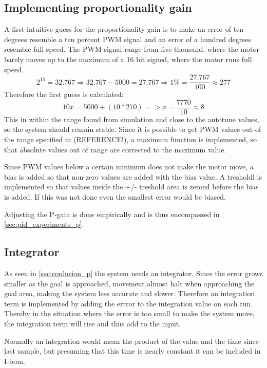 \subsection{Implementing proportionality gain}
A first intuitive guess for the proportionality gain is to make an error of ten degrees resemble a ten percent PWM signal and an error of a hundred degrees resemble full speed. The PWM signal range from five thousand, where the motor barely moves up to the maximum of a 16 bit signed, where the motor runs full speed.
\begin{equation}
2^{15} = 32.767 \Rightarrow 
32.767 - 5000 = 27.767 \Rightarrow 
1 \% = \frac{27.767}{100} \approx  277
	\label{eq:PWM}
\end{equation}
 Therefore the first guess is calculated:
\begin{equation}
10x = 5000 + (10 * 270) => x = \frac{7770}{10} \approx  8
	\label{eq:P-term}
\end{equation}
This in within the range found from simulation and close to the autotune values, so the system should remain stable. Since it is possible to get PWM values out of the range specified in (REFERENCE!), a maximum function is implemented, so that absolute values out of range are corrected to the maximum value.

Since PWM values below a certain minimum does not make the motor move, a bias is added so that non-zero values are added with the bias value. A tresholdl is implemented so that values inside the +/- treshold area is zeroed before the bias is added. If this was not done even the smallest error would be biased.

Adjusting the P-gain is done empirically and is thus encompassed in \ref{sec:pid_experiments_p}.

\subsection{Integrator}\label{sec:integrator}
As seen in \ref{sec:conlusion_p} the system needs an integrator. Since the error grows smaller as the goal is approached, movement almost halt when approaching the goal area, making the system less accurate and slower. Therefore an integration term is implemented by adding the errror to the integration value on each run. Thereby in the situation where the error is too small to make the system move, the integration term will rise and thus add to the input. 

Normally an integration would mean the product of the value and the time since last sample, but presuming that this time is nearly constant it can be included in I-term. 

